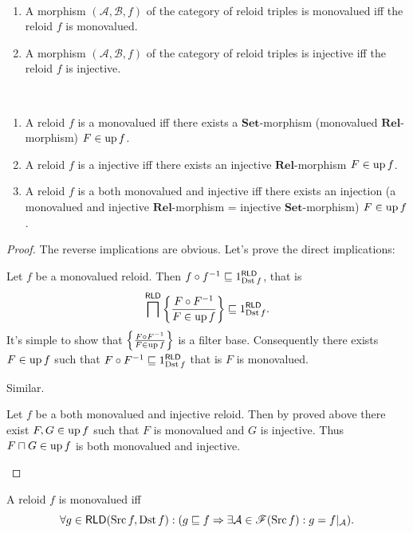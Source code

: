 \begin{obvious}
~
\begin{enumerate}
\item A morphism $(\mathcal{A},\mathcal{B},f)$ of the category of reloid
triples is monovalued iff the reloid $f$ is monovalued.
\item A morphism $(\mathcal{A},\mathcal{B},f)$ of the category of reloid
triples is injective iff the reloid $f$ is injective.
\end{enumerate}
\end{obvious}
\begin{thm}
~
\begin{enumerate}
\item \label{rld-mon-gr}A reloid $f$ is a monovalued iff there exists
a $\mathbf{Set}$-morphism (monovalued $\mathbf{Rel}$-morphism) $F\in\operatorname{up} f$.
\item \label{rld-mon-inj}A reloid $f$ is a injective iff there exists
an injective $\mathbf{Rel}$-morphism $F\in\operatorname{up} f$.
\item \label{rld-mon-both}A reloid $f$ is a both monovalued and injective
iff there exists an injection (a monovalued and injective $\mathbf{Rel}$-morphism
= injective $\mathbf{Set}$-morphism) $F\in\operatorname{up} f$.
\end{enumerate}
\end{thm}
\begin{proof}
The reverse implications are obvious. Let's prove the direct implications:
\begin{widedisorder}
\item [{\ref{rld-mon-gr}}] Let $f$ be a monovalued reloid. Then $f\circ f^{-1}\sqsubseteq 1_{\operatorname{Dst} f}^{\mathsf{RLD}}$,
that is
\[\bigsqcap^{\mathsf{RLD}}\left\{ \frac{F\circ F^{-1}}{F\in\operatorname{up} f}\right\}\sqsubseteq 1_{\operatorname{Dst} f}^{\mathsf{RLD}}.\]
It's simple to show that $\left\{ \frac{F\circ F^{-1}}{F\in\operatorname{up} f}\right\}$ is
a filter base. Consequently there exists $F\in\operatorname{up} f$ such that $F\circ F^{-1}\sqsubseteq 1_{\operatorname{Dst} f}^{\mathsf{RLD}}$
that is $F$ is monovalued.
\item [{\ref{rld-mon-inj}}] Similar.
\item [{\ref{rld-mon-both}}] Let $f$ be a both monovalued and injective
reloid. Then by proved above there exist $F,G\in\operatorname{up} f$ such that
$F$ is monovalued and $G$ is injective. Thus $F\sqcap G\in\operatorname{up} f$
is both monovalued and injective.
\end{widedisorder}
\end{proof}
\begin{conjecture}
A reloid $f$ is monovalued iff
\[
\forall g\in\mathsf{\mathsf{RLD}}(\operatorname{Src} f,\operatorname{Dst} f):(g\sqsubseteq f\Rightarrow\exists\mathcal{A}\in\mathscr{F}(\operatorname{Src} f):g=f|_{\mathcal{A}}).
\]

\end{conjecture}

